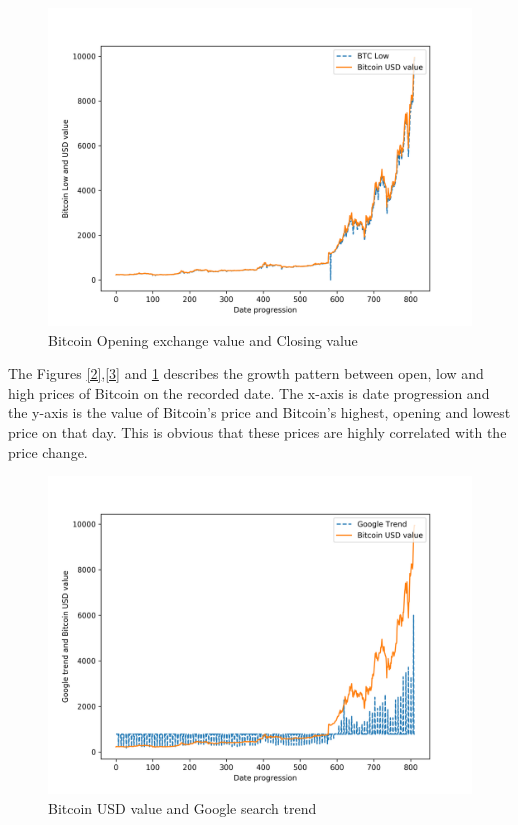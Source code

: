 \documentclass[sigconf]{acmart}
\begin{document}
\begin{figure}[!ht]
  \centering\includegraphics[width=\columnwidth]{images/low.png}
  \caption{Bitcoin Opening exchange value and Closing value}
  \label{4}
\end{figure}

The Figures \ref{2},\ref{3} and \ref{4} describes the growth pattern between open, low and high prices of Bitcoin on the recorded date.
The x-axis is date progression and the y-axis is the value of Bitcoin's price and Bitcoin's highest, opening and lowest price on that day. This is obvious that these prices are highly correlated with the price change.

\begin{figure}[!ht]
  \centering\includegraphics[width=\columnwidth]{images/googletrend.png}
  \caption{Bitcoin USD value and Google search trend}
  \label{5}
\end{figure}
\end{document}
